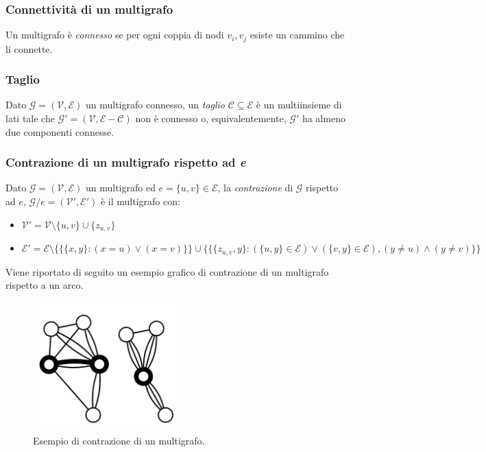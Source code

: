 \subsubsection*{Connettività di un multigrafo}
Un multigrafo è \textit{connesso} se per ogni coppia di nodi $v_i, v_j$ esiste un cammino che li connette.

\subsubsection*{Taglio}
Dato $\mathcal{G}=(\mathcal{V}, \mathcal{E})$ un multigrafo connesso, un \textit{taglio} $\mathcal{C} \subseteq \mathcal{E}$ è un multiinsieme di lati tale che $\mathcal{G}{}'=(\mathcal{V}, \mathcal{E}-\mathcal{C})$ non è connesso o, equivalentemente, $\mathcal{G}{}'$ ha almeno due componenti connesse.

\subsubsection*{Contrazione di un multigrafo rispetto ad \textit{e}}
Dato $\mathcal{G}=(\mathcal{V}, \mathcal{E})$ un multigrafo ed $e=\{u,v\} \in \mathcal{E}$, la \textit{contrazione} di $\mathcal{G}$ rispetto ad $e$, $\mathcal{G}/e=(\mathcal{V}{}', \mathcal{E}{}')$ è il multigrafo con:
\begin{itemize}
    \item[] $\mathcal{V}{}'=\mathcal{V} \setminus \{u, v\} \cup \{z_{u,v}\}$
    \item[] $\mathcal{E}{}'=\mathcal{E} \setminus \{\{\{x, y\}: (x=u) \vee (x=v)\}\} \cup \{\{\{z_{u,v}, y\}: (\{u,y\} \in \mathcal{E}) \vee (\{v,y\} \in \mathcal{E}), (y\neq u) \wedge (y \neq v) \}\}$
\end{itemize}
Viene riportato di seguito un esempio grafico di contrazione di un multigrafo rispetto a un arco.

\begin{figure}[H]
	\centering
	\includegraphics[width=0.5\textwidth]{res/images/multigraph}
	\caption{Esempio di contrazione di un multigrafo.}
	\label{fig:multigraph_contraction}
\end{figure}

